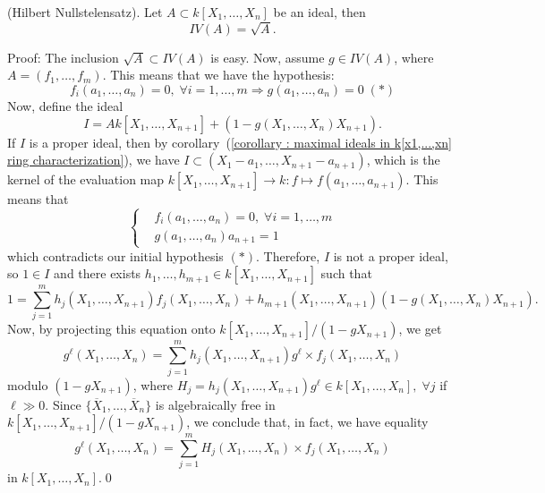 \begin{dang}
    \begin{theorem}\label{theorem : Hilbert Nullstelensatz}
        (Hilbert Nullstelensatz). Let $A\subset k[X_1,\dots, X_n]$ be an ideal, then 
        \begin{equation}
            IV(A) = \sqrt{A}.
        \end{equation}
    \end{theorem}
\end{dang}
Proof: The inclusion $\sqrt{A}\subset IV(A)$ is easy. Now, assume $g\in IV(A)$, where $A=(f_1,\dots, f_m)$. This 
means that we have the hypothesis:
\begin{equation}
    f_i(a_1,\dots, a_n)=0,\;\forall i=1,\dots,m\Rightarrow g(a_1,\dots, a_n)=0\; (*)
\end{equation}
Now, define the ideal 
\begin{equation}
    I = Ak[X_1,\dots, X_{n+1}] + (1- g(X_1,\dots, X_n)X_{n+1}).
\end{equation}
If $I$ is a proper ideal, then by corollary~(\ref{corollary : maximal ideals in k[x1,...,xn] ring characterization}), we have 
$I\subset (X_1-a_1,\dots, X_{n+1}-a_{n+1})$, which is the kernel of the evaluation map 
$k[X_1,\dots,X_{n+1}]\rightarrow k: f\mapsto f(a_1,\dots, a_{n+1})$. This means that 
\begin{equation}
    \left\{\begin{aligned}
        &f_i(a_1,\dots,a_n)=0,\;\forall i=1,\dots,m\\
        &g(a_1,\dots,a_n)a_{n+1}=1
    \end{aligned}\right.
\end{equation}
which contradicts our initial hypothesis $(*)$. Therefore, $I$ is not a proper ideal, so $1\in I$ and there exists 
$h_1,\dots, h_{m+1}\in k[X_1,\dots, X_{n+1}]$ such that 
\begin{equation}
    1 = \sum_{j=1}^mh_j(X_1,\dots, X_{n+1})f_j(X_1,\dots,X_n)  + h_{m+1}(X_1,\dots,X_{n+1})(1-g(X_1,\dots,X_n)X_{n+1}).
\end{equation}
Now, by projecting this equation onto $k[X_1,\dots, X_{n+1}]/(1-g X_{n+1})$, we get 
\begin{equation}
    g^\ell(X_1,\dots,X_n) = \sum_{j=1}^m h_j(X_1,\dots, X_{n+1})g^\ell  \times f_j(X_1,\dots,X_n)
\end{equation}
modulo $(1-g X_{n+1})$, where $H_j = h_j(X_1,\dots, X_{n+1})g^\ell\in k[X_1,\dots,X_n],\;\forall j$ if $\ell\gg0$. 
Since $\{\overline{X}_1,\dots,\overline{X}_{n}\}$ is algebraically free in $k[X_1,\dots, X_{n+1}]/(1-g X_{n+1})$, we 
conclude that, in fact, we have equality 
\begin{equation}
     g^\ell(X_1,\dots,X_n) = \sum_{j=1}^m H_j(X_1,\dots,X_n)  \times f_j(X_1,\dots,X_n)
\end{equation}
in $k[X_1,\dots,X_n]$.\qed

